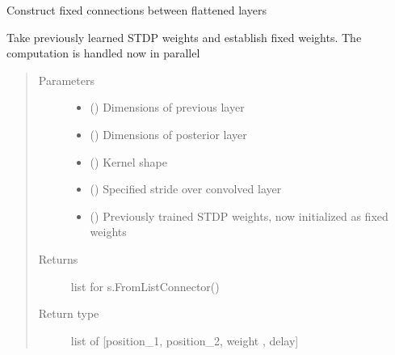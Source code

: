\documentclass[letterpaper,10pt,english]{sphinxmanual}
\begin{document}
\begin{fulllineitems}
\label{\detokenize{SpikingConvNet:SpikingConvNet.algorithms.rebuild_fixed_connections}}
Construct fixed connections between flattened layers

Take previously learned STDP weights and establish fixed weights.
The computation is handled now in parallel
\begin{quote}\begin{description}
\item[{Parameters}] \leavevmode\begin{itemize}
\item {} 
 () \textendash{} Dimensions of previous layer

\item {} 
 () \textendash{} Dimensions of posterior layer

\item {} 
 () \textendash{} Kernel shape

\item {} 
 () \textendash{} Specified stride over convolved layer

\item {} 
 () \textendash{} Previously trained STDP weights, now initialized as fixed weights

\end{itemize}

\item[{Returns}] \leavevmode
{} \textendash{} list for s.FromListConnector()

\item[{Return type}] \leavevmode
list of {[}position\_1, position\_2, weight , delay{]}

\end{description}\end{quote}

\end{fulllineitems}
\end{document}
